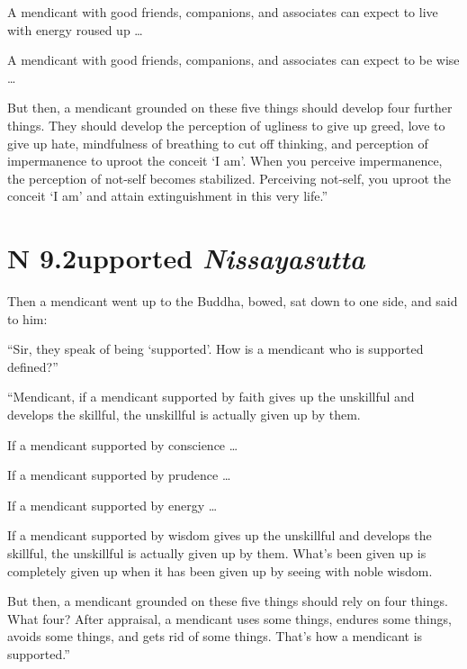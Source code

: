 \documentclass[12pt,openany]{book}%
\newcommand*{\suttatitleacronym}[1]{\smaller[2]{#1}\vspace*{.3em}}
\newcommand*{\suttatitletranslation}[1]{\linebreak{#1}}
\newcommand*{\suttatitleroot}[1]{\linebreak\smaller[2]\itshape{#1}}
\newcommand*{\tocacronym}[1]{\hspace*{-3.3em}{#1}\quad}
\newcommand*{\toctranslation}[1]{#1}
\newcommand*{\tocroot}[1]{(\textit{#1})}
\begin{document}
A mendicant with good friends, companions, and associates can expect to live with energy roused up … 

A mendicant with good friends, companions, and associates can expect to be wise … 

But then, a mendicant grounded on these five things should develop four further things. They should develop the perception of ugliness to give up greed, love to give up hate, mindfulness of breathing to cut off thinking, and perception of impermanence to uproot the conceit ‘I am’. When you perceive impermanence, the perception of not-self becomes stabilized. Perceiving not-self, you uproot the conceit ‘I am’ and attain extinguishment in this very life.” 

%
\section*{{\suttatitleacronym AN 9.2}{\suttatitletranslation Supported }{\suttatitleroot Nissayasutta}}
\addcontentsline{toc}{section}{\tocacronym{AN 9.2} \toctranslation{Supported } \tocroot{Nissayasutta}}

Then a mendicant went up to the Buddha, bowed, sat down to one side, and said to him: 

“Sir, they speak of being ‘supported’. How is a mendicant who is supported defined?” 

“Mendicant, if a mendicant supported by faith gives up the unskillful and develops the skillful, the unskillful is actually given up by them. 

If a mendicant supported by conscience … 

If a mendicant supported by prudence … 

If a mendicant supported by energy … 

If a mendicant supported by wisdom gives up the unskillful and develops the skillful, the unskillful is actually given up by them. What’s been given up is completely given up when it has been given up by seeing with noble wisdom. 

But then, a mendicant grounded on these five things should rely on four things. What four? After appraisal, a mendicant uses some things, endures some things, avoids some things, and gets rid of some things. That’s how a mendicant is supported.” 
\end{document}
